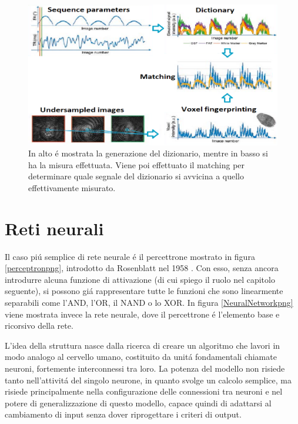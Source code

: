 \documentclass[a4paper,12pt]{report}
\begin{document}
 \begin{figure}[h!]
  \centering
  \includegraphics[scale=0.5]{MRF.png}
  \caption{In alto \'e mostrata la generazione del dizionario, mentre in basso si ha la misura effettuata. Viene poi effettuato il matching per determinare quale segnale del dizionario si avvicina a quello effettivamente misurato.}
  \label{MRFpng}
 \end{figure}
 
 
 \chapter{Reti neurali}  
 Il caso pi\'u semplice di rete neurale \'e il percettrone mostrato in figura \ref{perceptronpng}, introdotto da Rosenblatt nel 1958 \cite{rosenblatt1958perceptron}. 
 Con esso, senza ancora introdurre alcuna funzione di attivazione (di cui spiego il ruolo nel capitolo seguente), si possono gi\'a rappresentare tutte le funzioni che sono linearmente separabili come l'AND, l'OR, il NAND o lo XOR. 
 In figura \ref{NeuralNetworkpng} viene mostrata invece la rete neurale, dove il percettrone \'e l'elemento base e ricorsivo della rete. 
 
 L'idea della struttura nasce dalla ricerca di creare un algoritmo che lavori in modo analogo al cervello umano, costituito da unit\'a fondamentali chiamate neuroni, fortemente interconnessi tra loro. 
 La potenza del modello non risiede tanto nell'attivit\'a del singolo neurone, in quanto svolge un calcolo semplice, ma risiede principalmente nella configurazione delle connessioni tra neuroni e nel potere di generalizzazione di questo modello, capace quindi di adattarsi al cambiamento di input senza dover riprogettare i criteri di output.
 
\end{document}
